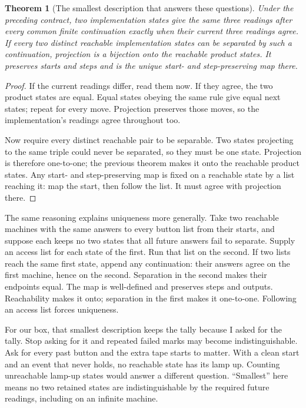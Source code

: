\documentclass[11pt,twoside]{article}
\theoremstyle{thielethm}
\newtheorem{theorem}{Theorem}[section]
\theoremstyle{thieledef}
\theoremstyle{thieledef}
\theoremstyle{thieledef}
\theoremstyle{thielethm}
\theoremstyle{thieleobs}
\theoremstyle{thielethm}
\begin{document}
\begin{theorem}[The smallest description that answers these questions]\label{thm:lift-reachable-minimal}
Under the preceding contract, two implementation states give the same three
readings after every common finite continuation exactly when their current
three readings agree. If every two distinct reachable implementation states
can be separated by such a continuation, projection is a bijection onto the
reachable product states. It preserves starts and steps and is the unique
start- and step-preserving map there.
\end{theorem}
\begin{proof}
If the current readings differ, read them now. If they agree, the two
product states are equal. Equal states obeying the same rule give equal
next states; repeat for every move. Projection preserves those moves, so
the implementation's readings agree throughout too.

Now require every distinct reachable pair to be separable. Two states
projecting to the same triple could never be separated, so they must be
one state. Projection is therefore one-to-one; the previous theorem makes
it onto the reachable product states. Any start- and step-preserving map
is fixed on a reachable state by a list reaching it: map the start, then
follow the list. It must agree with projection there.
\end{proof}

The same reasoning explains uniqueness more generally. Take two reachable
machines with the same answers to every button list from their starts, and
suppose each keeps no two states that all future answers fail to separate.
Supply an access list for each state of the first. Run that list on the
second. If two lists reach the same first state, append any continuation:
their answers agree on the first machine, hence on the second. Separation
in the second makes their endpoints equal. The map is well-defined and
preserves steps and outputs. Reachability makes it onto; separation in
the first makes it one-to-one. Following an access list forces uniqueness.

For our box, that smallest description keeps the tally because I asked
for the tally. Stop asking for it and repeated failed marks may become
indistinguishable. Ask for every past button and the extra tape starts to
matter. With a clean start and an event that never holds, no reachable
state has its lamp up. Counting unreachable lamp-up states would answer
a different question. ``Smallest'' here means no two retained states are
indistinguishable by the required future readings, including on an
infinite machine.
\end{document}
